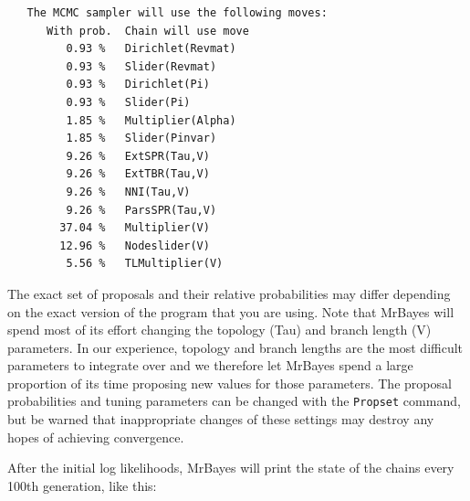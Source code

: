 \documentclass[12pt]{book}
\begin{document}
\begin{singlespacing}
\small
\begin{verbatim}
   The MCMC sampler will use the following moves:
      With prob.  Chain will use move
         0.93 %   Dirichlet(Revmat)
         0.93 %   Slider(Revmat)
         0.93 %   Dirichlet(Pi)
         0.93 %   Slider(Pi)
         1.85 %   Multiplier(Alpha)
         1.85 %   Slider(Pinvar)
         9.26 %   ExtSPR(Tau,V)
         9.26 %   ExtTBR(Tau,V)
         9.26 %   NNI(Tau,V)
         9.26 %   ParsSPR(Tau,V)
        37.04 %   Multiplier(V)
        12.96 %   Nodeslider(V)
         5.56 %   TLMultiplier(V)
\end{verbatim}
\normalsize
\end{singlespacing}
The exact set of proposals and their relative probabilities may differ depending on the exact version of the 
program that you are using. Note that MrBayes will spend most of its effort changing the topology (Tau) and 
branch length (V) parameters. In our experience, topology and branch lengths are the most difficult 
parameters to integrate over and we therefore let MrBayes spend a large proportion of its time proposing new 
values for those parameters. The proposal probabilities and tuning parameters can be changed with the 
\texttt{Propset} command, but be warned that inappropriate changes of these settings may destroy any hopes 
of achieving convergence.

After the initial log likelihoods, MrBayes will print the state of the chains every 100th generation, like 
this:
\end{document}
